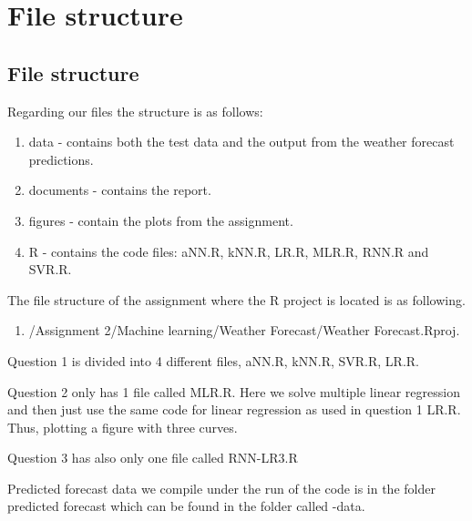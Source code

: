 \documentclass[
11pt, %
english, %
singlespacing, %
parskip, %
headsepline, %
]{report} %
\begin{document}
\appendix
    

\section{File structure}
	    
	\subsection{File structure}
	    
	    Regarding our files the structure is as follows:
	    
	    \begin{enumerate}
	        \item data - contains both the test data and the output from the weather forecast predictions.
	        \item documents - contains the report.
	        \item figures - contain the plots from the assignment.
	        \item R - contains the code files: aNN.R, kNN.R, LR.R, MLR.R, RNN.R and SVR.R.
	    \end{enumerate}
	 
	    The file structure of the assignment where the R project is located is as following.
	    \begin{enumerate}
	        \item /Assignment 2/Machine learning/Weather Forecast/Weather Forecast.Rproj.
	    \end{enumerate}
	    
	    Question 1 is divided into 4 different files, aNN.R, kNN.R, SVR.R, LR.R.
	    
	    Question 2 only has 1 file called MLR.R. Here we solve multiple linear regression and then just use the same code for linear regression as used in question 1 LR.R. Thus, plotting a figure with three curves.
	    
	    Question 3 has also only one file called RNN-LR3.R
	    
	    Predicted forecast data we compile under the run of the code is in the folder predicted forecast which can be found in the folder called -data.
        
\end{document}
